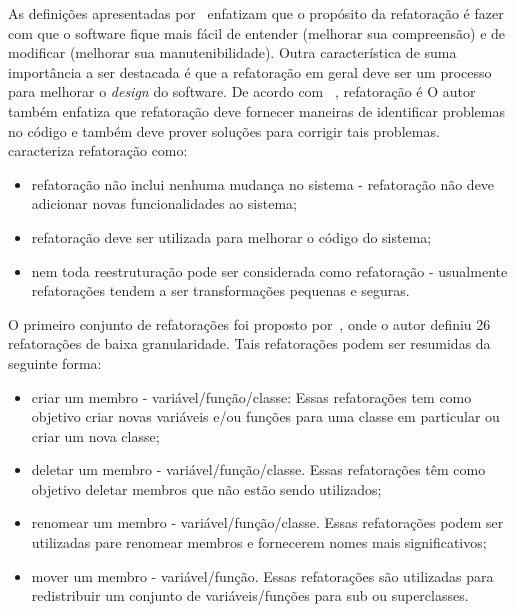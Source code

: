 As definições apresentadas por~ enfatizam que o propósito da refatoração é fazer com que o software fique mais fácil de entender (melhorar sua compreensão) e de modificar (melhorar sua manutenibilidade). Outra característica de suma importância a ser destacada é que a refatoração em geral deve ser um processo para melhorar o \textit{design} do software. De acordo com~ , refatoração é  O autor também enfatiza que refatoração deve fornecer maneiras de identificar problemas no código e também deve prover soluções para corrigir tais problemas.~ caracteriza refatoração como:

\begin{itemize}
	\item refatoração não inclui nenhuma mudança no sistema - refatoração não deve adicionar novas funcionalidades ao sistema;
	\item refatoração deve ser utilizada para melhorar o código do sistema;
	\item nem toda reestruturação pode ser considerada como refatoração - usualmente refatorações tendem a ser transformações pequenas e seguras. 
\end{itemize}

O primeiro conjunto de refatorações foi proposto por~, onde o autor definiu 26 refatorações de baixa granularidade. Tais refatorações podem ser resumidas da seguinte forma:

\begin{itemize}
	\item criar um membro  - variável/função/classe: Essas refatorações tem como objetivo criar novas variáveis e/ou funções para uma classe em particular ou criar um nova classe;
	\item deletar um membro - variável/função/classe. Essas refatorações têm como objetivo  deletar membros que não estão sendo utilizados;
	\item renomear um membro - variável/função/classe. Essas refatorações podem ser utilizadas pare renomear membros e fornecerem nomes mais significativos;
	\item mover um membro - variável/função. Essas refatorações são utilizadas para redistribuir um conjunto de variáveis/funções para sub ou superclasses.
\end{itemize}

